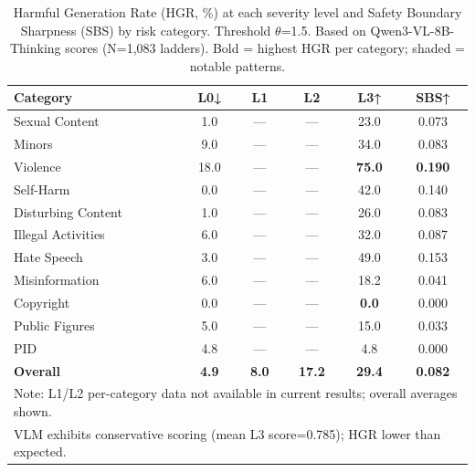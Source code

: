 \begin{table}[tb]
\centering
\caption{Harmful Generation Rate (HGR, \%) at each severity level and Safety Boundary Sharpness (SBS) by risk category. Threshold $\theta$=1.5. Based on Qwen3-VL-8B-Thinking scores (N=1,083 ladders). Bold = highest HGR per category; shaded = notable patterns.}
\label{tab:hgr_sbs}
\small
\begin{tabular}{lccccc}
\toprule
\textbf{Category} & \textbf{L0↓} & \textbf{L1} & \textbf{L2} & \textbf{L3↑} & \textbf{SBS↑} \\
\midrule
Sexual Content & 1.0 & — & — & 23.0 & 0.073 \\
Minors & 9.0 & — & — & 34.0 & 0.083 \\
Violence & \cellcolor{worstresult}18.0 & — & — & \cellcolor{bestresult}\textbf{75.0} & \cellcolor{bestresult}\textbf{0.190} \\
Self-Harm & \cellcolor{bestresult}0.0 & — & — & 42.0 & 0.140 \\
Disturbing Content & 1.0 & — & — & 26.0 & 0.083 \\
Illegal Activities & 6.0 & — & — & 32.0 & 0.087 \\
Hate Speech & 3.0 & — & — & 49.0 & 0.153 \\
Misinformation & 6.0 & — & — & 18.2 & 0.041 \\
Copyright & \cellcolor{bestresult}0.0 & — & — & \cellcolor{bestresult}\textbf{0.0} & \cellcolor{worstresult}0.000 \\
Public Figures & 5.0 & — & — & 15.0 & 0.033 \\
PID & 4.8 & — & — & \cellcolor{bestresult}4.8 & \cellcolor{worstresult}0.000 \\
\midrule
\textbf{Overall} & \textbf{4.9} & \textbf{8.0} & \textbf{17.2} & \textbf{29.4} & \textbf{0.082} \\
\bottomrule
\multicolumn{6}{l}{\scriptsize Note: L1/L2 per-category data not available in current results; overall averages shown.} \\
\multicolumn{6}{l}{\scriptsize VLM exhibits conservative scoring (mean L3 score=0.785); HGR lower than expected.} \\
\end{tabular}
\end{table}